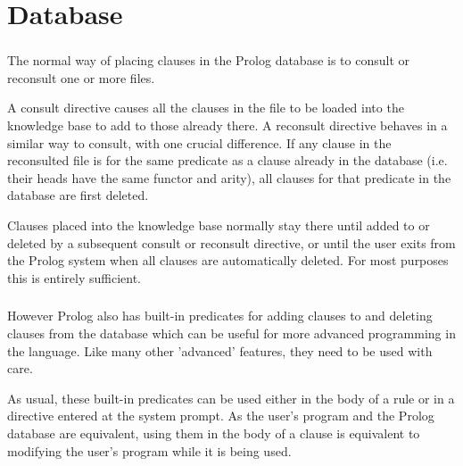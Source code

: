 \section{Database}

\begin{frame}
	\frametitle{\insertsection}
	
	The normal way of placing clauses in the Prolog database is to consult or reconsult one or more files.
	
	A consult directive causes all the clauses in the file to be loaded into the knowledge base to add to those already there. A reconsult directive behaves in a similar way to consult, with one crucial	difference. If any clause in the reconsulted file is for the same predicate as a clause	already in the database (i.e. their heads have the same functor and arity), all clauses
	for that predicate in the database are first deleted.
	
	Clauses placed into the knowledge base normally stay there until added to or deleted by a subsequent consult or reconsult directive, or until the user exits from the Prolog system when all clauses are automatically deleted. For most purposes this is entirely sufficient.
\end{frame}


\begin{frame}
	\frametitle{\insertsection}
	
	However Prolog also has built-in predicates for adding clauses to and deleting clauses from the database which can be useful for more advanced programming in the language. Like many other 'advanced' features, they need to be used with care.
	
	As usual, these built-in predicates can be used either in the body of a rule or in a directive entered at the system prompt. As the user's program and the Prolog database are equivalent, using them in the body of a clause is equivalent to modifying the user's program while it is being used.
\end{frame}




